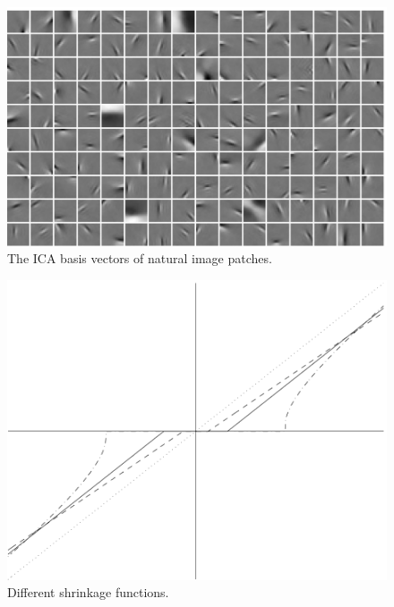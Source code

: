 \begin{enumerate}
\begin{solution}
    \begin{figure}[h]
      \centering
      \includegraphics[width=0.5\linewidth]{fig1905}
      \caption{The ICA basis vectors of natural image
        patches.  \label{fig:ica_basis}}
    \end{figure}
    \begin{figure}[h]
      \centering
      \includegraphics[width=0.5\linewidth]{fig1401}
      \caption{Different shrinkage functions. \label{fig:shrinkage}}
    \end{figure}
    \begin{figure}[h]
      \centering
      \hfill

\end{figure}
\end{solution}
\end{enumerate}
